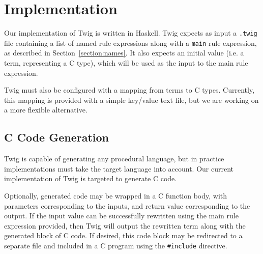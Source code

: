 
\section{Implementation}

Our implementation of Twig is written in Haskell. Twig expects as input a \texttt{.twig} file containing a list of named rule expressions along with a \texttt{main} rule expression, as described in Section~\ref{section:names}. It also expects an initial value (i.e. a term, representing a C type), which will be used as the input to the main rule expression.

Twig must also be configured with a mapping from terms to C types. Currently, this mapping is provided with a simple key/value text file, but we are working on a more flexible alternative.

\subsection{C Code Generation}

Twig is capable of generating any procedural language, but in practice implementations must take the target language into account. Our current implementation of Twig is targeted to generate C code.

Optionally, generated code may be wrapped in a C function body, with parameters corresponding to the inputs, and return value corresponding to the output. If the input value can be successfully rewritten using the main rule expression provided, then Twig will output the rewritten term along with the generated block of C code. If desired, this code block may be redirected to a separate file and included in a C program using the \texttt{\#include} directive.
